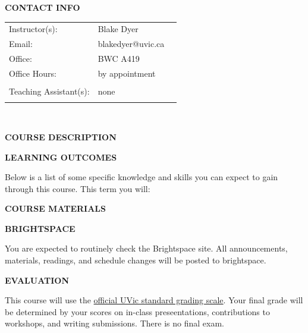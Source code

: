 \documentclass[11pt]{article}
\begin{document}
\textbf{CONTACT INFO}

\begin{center}
  \centering
  \begin{tabular}{ L{.25\linewidth}L{.25\linewidth}L{.0\linewidth} }
    Instructor(s):      & Blake Dyer &  \\
    Email:      & blakedyer@uvic.ca &  \\
    Office:      & BWC A419 &  \\
    Office Hours:      & by appointment &  \\
          &  &  \\
Teaching Assistant(s):      & none &  \\
      &  &  \\
  \end{tabular}\\
\end{center}

\begin{center}
\textbf{COURSE DESCRIPTION}
\end{center}


\clearpage

\textbf{LEARNING OUTCOMES}

Below is a list of some specific knowledge and skills you can expect to gain through this course. This term you will:
\begin{itemize}
	\setlength\itemsep{0em}
        {\item \learningoutcome}
\end{itemize}


\textbf{COURSE MATERIALS}



\textbf{BRIGHTSPACE}

You are expected to routinely check the Brightspace site. All announcements, materials, readings, and schedule changes will be posted to brightspace.

\begin{center}
  \textbf{EVALUATION}
\end{center}

This course will use the \href{https://www.uvic.ca/calendar/future/undergrad/index.php#/policy/S1AAgoGuV?bc=true&bcCurrent=14%20-%20Grading&bcGroup=Undergraduate%20Academic%20Regulations&bcItemType=policies}{official UVic standard grading scale}. Your final grade will be determined by your scores on in-class preseentations, contributions to workshops, and writing submissions. There is no final exam.
\end{document}
